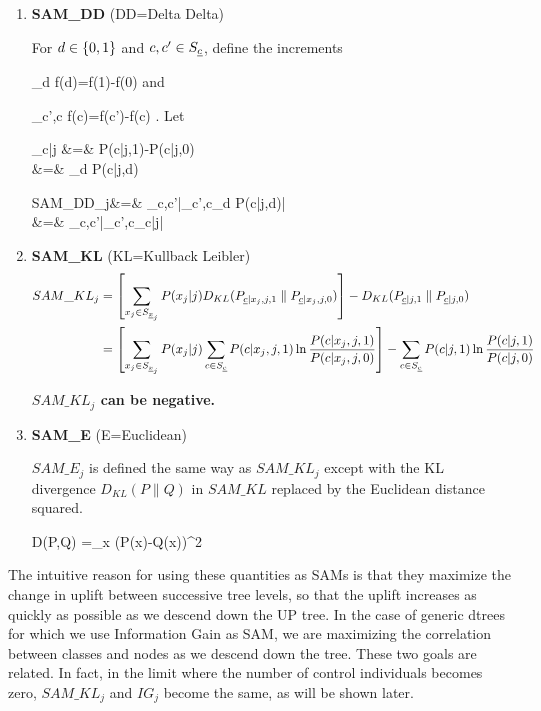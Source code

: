 \begin{enumerate}
\item{\bf SAM\_DD} (DD=Delta Delta)

For $d\in \{0,1\}$
and $c, c'\in S_\rvc$, define the increments

\beq
\partial_d f(d)=f(1)-f(0)
\eeq
and

\beq
\partial_{c',c} f(c)=f(c')-f(c)
\;.
\eeq
Let

\beqa
\Delta_{c|j} &=& P(c|j,1)-P(c|j,0)
\\
&=& \partial_d P(c|j,d)
\label{eq-delta-c-j}
\eeqa

\beqa
SAM\_DD_j&=& \max_{c,c'}|\partial_{c',c}\partial_d P(c|j,d)|
\\
&=&
\max_{c,c'}|\partial_{c',c}\Delta_{c|j}|
\eeqa

\item{\bf SAM\_KL} (KL=Kullback Leibler)
\begin{align}
SAM\_KL_j&=
\left[
\sum_{x_j\in S_{\rvx_j}}
P(x_j|j)
D_{KL}(P_{\rvc|x_j,j,1}\parallel P_{\rvc|x_j,j,0})
\right]
-
D_{KL}(P_{\rvc|j,1}\parallel P_{\rvc|j,0})
\\
&=
\left[
\sum_{x_j\in S_{\rvx_j}}
P(x_j|j)
 \sum_{c\in S_\rvc}P(c|x_j,j,1) 
\ln \frac{P(c|x_j,j,1) }{ P(c|x_j,j,0) }
\right]
-
\sum_{c\in S_\rvc} 
P(c|j,1) 
\ln \frac{P(c|j,1) }{ P(c|j,0) }
\label{eq-sam-kl}
\end{align}

{\bf $SAM\_KL_j$ can be negative.}

\item {\bf SAM\_E} (E=Euclidean)

$SAM\_E_j$ is defined the same way as $SAM\_KL_j$
except with 
the KL divergence $D_{KL}(P\parallel Q)$ 
in $SAM\_KL$ replaced 
by the Euclidean distance squared. 


\beq
D(P,Q) =\sum_x (P(x)-Q(x))^2
\eeq

\end{enumerate}

The intuitive reason for
 using these quantities as
SAMs is that they maximize the change in uplift 
between 
successive tree levels, so 
that the uplift increases as quickly as possible
as we descend down the UP tree.
In the case of generic dtrees
for which we use Information Gain as SAM, we 
are maximizing the correlation
between classes and nodes as we descend down the tree. 
These two goals are related.
In fact, in the limit
where the
number of control individuals
becomes zero,
$SAM\_KL_j$ and $IG_j$
become the same, as will be shown later.

